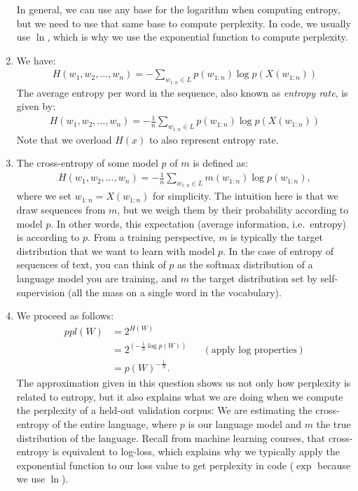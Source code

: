 \documentclass[11pt,a4paper]{article}
\begin{document}
\begin{enumerate}[label=(\alph*)]
          In general, we can use any base for the logarithm when computing
          entropy, but we need to use that same base to compute perplexity.
          In code, we usually use $\ln$, which is why we use the exponential
          function to compute perplexity.
    \item We have:
          \begin{align*}
              H(w_1,w_2,\ldots,w_n) = -\sum_{w_{1:n}\in L} p(w_{1:n})\log p(X(w_{1:n}))
          \end{align*}
          The average entropy per word in the sequence, also known as
          \emph{entropy rate}, is given by:
          \begin{align*}
              H(w_1,w_2,\ldots,w_n) = -\frac{1}{n}\sum_{w_{1:n}\in L} p(w_{1:n})\log p(X(w_{1:n}))
          \end{align*}
          Note that we overload $H(x)$ to also represent entropy rate.
    \item The cross-entropy of some model $p$ of $m$ is defined as:
          \begin{align*}
              H(w_1,w_2,\ldots,w_n) = -\frac{1}{n}\sum_{w_{1:n}\in L} m(w_{1:n})\log p(w_{1:n}),
          \end{align*}
          where we set $w_{1:n} = X(w_{1:n})$ for simplicity.
          The intuition here is that we draw sequences from $m$, but we weigh
          them by their probability according to model $p$.
          In other words, this expectation (average information, i.e.\ entropy)
          is according to $p$.
          From a training perspective, $m$ is typically the target distribution
          that we want to learn with model $p$.
          In the case of entropy of sequences of text, you can think of $p$
          as the softmax distribution of a language model you are training,
          and $m$ the target distribution set by self-supervision (all the
          mass on a single word in the vocabulary).
    \item We proceed as follows:
          \begin{align*}
              ppl(W) & = 2^{H(W)}                                                                   \\
                     & = 2^{\left(-\frac{1}{N} \log p(W)\right)} &  & (\text{apply log properties}) \\
                     & = p(W)^{-\frac{1}{N}}.
          \end{align*}
          The approximation given in this question shows us not only how
          perplexity is related to entropy, but it also explains what we are
          doing when we compute the perplexity of a held-out validation corpus:
          We are estimating the cross-entropy of the entire language, where $p$
          is our language model and $m$ the true distribution of the language.
          Recall from machine learning courses, that cross-entropy is equivalent
          to log-loss, which explains why we typically apply the exponential
          function to our loss value to get perplexity in code ($\exp$ because
          we use $\ln$).
\end{enumerate}
\end{document}
